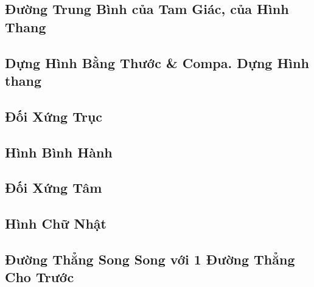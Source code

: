 \documentclass{article}
\numberwithin{equation}{section}
\begin{document}

\subsection{Đường Trung Bình của Tam Giác, của Hình Thang}


\subsection{Dựng Hình Bằng Thước \& Compa. Dựng Hình thang}


\subsection{Đối Xứng Trục}


\subsection{Hình Bình Hành}


\subsection{Đối Xứng Tâm}


\subsection{Hình Chữ Nhật}


\subsection{Đường Thẳng Song Song với 1 Đường Thẳng Cho Trước}

\end{document}
